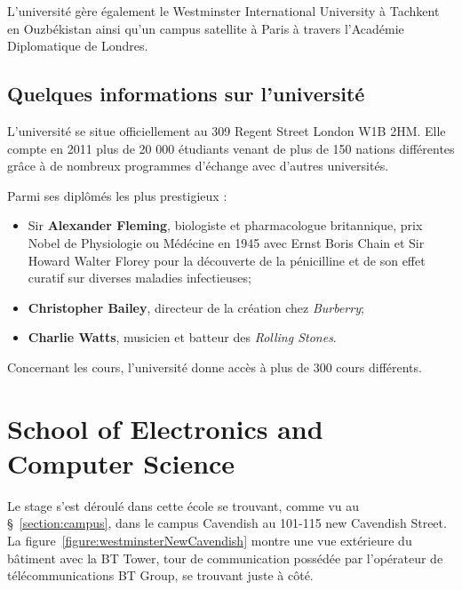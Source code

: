 \vspace{0.20cm}

L'universit\'e g\`ere \'egalement le Westminster International University \`a Tachkent en Ouzb\'ekistan ainsi qu'un campus satellite \`a Paris \`a travers l'Acad\'emie Diplomatique de Londres.

\subsection{Quelques informations sur l'universit\'e}

L'universit\'e se situe officiellement au 309 Regent Street London W1B 2HM.
Elle compte en 2011 plus de 20 000 \'etudiants venant de plus de 150 nations diff\'erentes gr\^ace \`a de nombreux programmes d'\'echange avec d'autres universit\'es.

\noindent Parmi ses dipl\^om\'es les plus prestigieux :

\begin{itemize}
	\item Sir \textbf{Alexander Fleming}, biologiste et pharmacologue britannique, prix Nobel de Physiologie ou M\'ed\'ecine en 1945 avec Ernst Boris Chain et Sir Howard Walter Florey pour la d\'ecouverte de la p\'enicilline et de son effet curatif sur diverses maladies infectieuses;
	\item \textbf{Christopher Bailey}, directeur de la cr\'eation chez \textit{Burberry};
	\item \textbf{Charlie Watts}, musicien et batteur des \textit{Rolling Stones}.

\end{itemize}

\vspace{0.20cm}

\noindent Concernant les cours, l'universit\'e donne acc\`es \`a plus de 300 cours diff\'erents.

\section{School of Electronics and Computer Science}

Le stage s'est d\'eroul\'e dans cette \'ecole se trouvant, comme vu au \S~\ref{section:campus}, dans le campus Cavendish au 101-115 new Cavendish Street. 
La figure~\ref{figure:westminsterNewCavendish} montre une vue ext\'erieure du b\^atiment avec la BT Tower, tour de communication poss\'ed\'ee par l'op\'erateur de t\'el\'ecommunications BT Group, se trouvant juste \`a c\^ot\'e.

